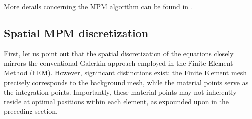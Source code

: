 \documentclass[11pt,english]{article}
\begin{document}
 More details concerning the MPM algorithm can be found in \cite{iaconeta2019discrete,iaconeta2019stabilized}.

    
    \subsection{Spatial MPM discretization} \label{sec:spatial-discretization}

    First, let us point out that the spatial discretization of the equations closely mirrors the conventional Galerkin approach employed in the Finite Element Method (FEM). However, significant distinctions exist: the Finite Element mesh precisely corresponds to the background mesh, while the material points serve as the integration points. Importantly, these material points may not inherently reside at optimal positions within each element, as expounded upon in the preceding section.
  
\end{document}

